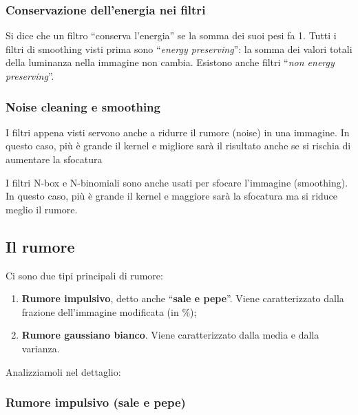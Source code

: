 \documentclass[
]{article}
\providecommand{\tightlist}{%
  \setlength{\itemsep}{0pt}\setlength{\parskip}{0pt}}
\begin{document}
\hypertarget{conservazione-dellenergia-nei-filtri}{%
\subsubsection{Conservazione dell'energia nei filtri}\label{conservazione-dellenergia-nei-filtri}}

Si dice che un filtro ``conserva l'energia'' se la somma dei suoi pesi fa 1. Tutti i filtri di smoothing visti prima sono ``\emph{energy preserving}'': la somma dei valori totali della luminanza nella immagine non cambia. Esistono anche filtri ``\emph{non energy preserving}''.

\hypertarget{noise-cleaning-e-smoothing}{%
\subsubsection{Noise cleaning e smoothing}\label{noise-cleaning-e-smoothing}}

I filtri appena visti servono anche a ridurre il rumore (noise) in una immagine. In questo caso, più è grande il kernel e migliore sarà il risultato anche se si rischia di aumentare la sfocatura

I filtri N-box e N-binomiali sono anche usati per sfocare l'immagine (smoothing). In questo caso, più è grande il kernel e maggiore sarà la sfocatura ma si riduce meglio il rumore.

\hypertarget{il-rumore}{%
\subsection{Il rumore}\label{il-rumore}}

Ci sono due tipi principali di rumore:

\begin{enumerate}
\def\labelenumi{\arabic{enumi}.}
\tightlist
\item
  \textbf{Rumore impulsivo}, detto anche ``\textbf{sale e pepe}''. Viene caratterizzato dalla frazione dell'immagine modificata (in \%);
\item
  \textbf{Rumore gaussiano bianco}. Viene caratterizzato dalla media e dalla varianza.
\end{enumerate}

Analizziamoli nel dettaglio:

\hypertarget{rumore-impulsivo-sale-e-pepe}{%
\subsubsection{Rumore impulsivo (sale e pepe)}\label{rumore-impulsivo-sale-e-pepe}}
\end{document}
